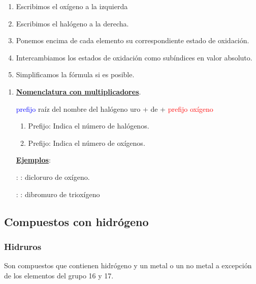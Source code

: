 \documentclass[12pt]{article}
\begin{document}
\vspace*{2mm}
\begin{enumerate}[label=\itembolascolor{\arabic*}{green!50!black}]
    \item Escribimos el oxígeno a la izquierda
    \item Escribimos el halógeno a la derecha.
    \item Ponemos encima de cada elemento su correspondiente estado de oxidación.
    \item Intercambiamos los estados de oxidación como subíndices en valor absoluto.
    \item Simplificamos la fórmula si es posible.
\end{enumerate}


\begin{enumerate}[label=\itembolascolor{\arabic*}{blue}]
    \item \textbf{\uline{Nomenclatura con multiplicadores}}.
          \begin{center}
              \textcolor{blue}{prefijo} \textcolor{azulF}{raíz del nombre del halógeno} \textcolor{green!50!black}{uro} + de + \textcolor{red}{prefijo} \textcolor{red}{oxígeno}
          \end{center}

          \begin{enumerate}[label=\textcolor{red}{$\bullet$}]
              \item Prefijo: Indica el número de halógenos.
              \item Prefijo: Indica el número de oxígenos.
          \end{enumerate}

          \textbf{\uline{Ejemplos}}:

           : : dicloruro de oxígeno.

           : : dibromuro de trioxígeno
\end{enumerate}



\subsection{Compuestos con hidrógeno}

\subsubsection{Hidruros}\label{sec:hidruros}
Son compuestos que contienen hidrógeno y un metal o un no metal a excepción de los elementos del grupo 16 y 17.
\end{document}
